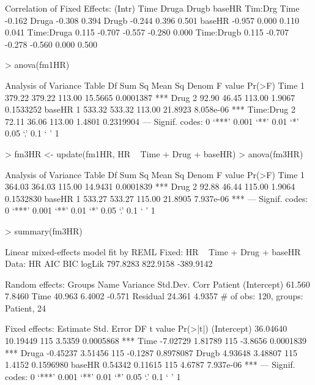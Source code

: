 \documentclass[12pt]{article}
\begin{document}
\begin{Schunk}
\begin{Soutput}
Correlation of Fixed Effects:
           (Intr) Time   Druga  Drugb  baseHR Tim:Drg
Time       -0.162                                    
Druga      -0.308  0.394                             
Drugb      -0.244  0.396  0.501                      
baseHR     -0.957  0.000  0.110  0.041               
Time:Druga  0.115 -0.707 -0.557 -0.280  0.000        
Time:Drugb  0.115 -0.707 -0.278 -0.560  0.000  0.500 
\end{Soutput}
\begin{Sinput}
> anova(fm1HR)
\end{Sinput}
\begin{Soutput}
Analysis of Variance Table
          Df Sum Sq Mean Sq  Denom F value    Pr(>F)    
Time       1 379.22  379.22 113.00 15.5665 0.0001387 ***
Drug       2  92.90   46.45 113.00  1.9067 0.1533252    
baseHR     1 533.32  533.32 113.00 21.8923 8.058e-06 ***
Time:Drug  2  72.11   36.06 113.00  1.4801 0.2319904    
---
Signif. codes:  0 `***' 0.001 `**' 0.01 `*' 0.05 `.' 0.1 ` ' 1 
\end{Soutput}
\begin{Sinput}
> fm3HR <- update(fm1HR, HR ~ Time + Drug + baseHR)
> anova(fm3HR)
\end{Sinput}
\begin{Soutput}
Analysis of Variance Table
       Df Sum Sq Mean Sq  Denom F value    Pr(>F)    
Time    1 364.03  364.03 115.00 14.9431 0.0001839 ***
Drug    2  92.88   46.44 115.00  1.9064 0.1532830    
baseHR  1 533.27  533.27 115.00 21.8905 7.937e-06 ***
---
Signif. codes:  0 `***' 0.001 `**' 0.01 `*' 0.05 `.' 0.1 ` ' 1 
\end{Soutput}
\begin{Sinput}
> summary(fm3HR)
\end{Sinput}
\begin{Soutput}
Linear mixed-effects model fit by REML
Fixed: HR ~ Time + Drug + baseHR 
 Data: HR 
      AIC      BIC    logLik
 797.8283 822.9158 -389.9142

Random effects:
 Groups   Name        Variance Std.Dev. Corr   
 Patient  (Intercept) 61.560   7.8460          
          Time        40.963   6.4002   -0.571 
 Residual             24.361   4.9357          
# of obs: 120, groups: Patient, 24

Fixed effects:
             Estimate Std. Error  DF t value  Pr(>|t|)    
(Intercept)  36.04640   10.19449 115  3.5359 0.0005868 ***
Time         -7.02729    1.81789 115 -3.8656 0.0001839 ***
Druga        -0.45237    3.51456 115 -0.1287 0.8978087    
Drugb         4.93648    3.48807 115  1.4152 0.1596980    
baseHR        0.54342    0.11615 115  4.6787 7.937e-06 ***
---
Signif. codes:  0 `***' 0.001 `**' 0.01 `*' 0.05 `.' 0.1 ` ' 1 


\end{Soutput}
\end{Schunk}
\end{document}
